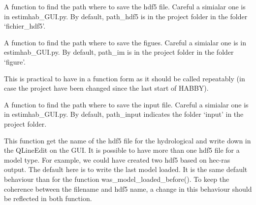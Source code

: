\documentclass[letterpaper,10pt,english]{sphinxmanual}
\begin{document}
\begin{fulllineitems}
\begin{fulllineitems}
\end{fulllineitems}


\begin{fulllineitems}
\label{\detokenize{index:src_GUI.hydro_GUI_2.SubHydroW.find_path_hdf5}}
A function to find the path where to save the hdf5 file. Careful a simialar one is in estimhab\_GUI.py. By default,
path\_hdf5 is in the project folder in the folder `fichier\_hdf5'.

\end{fulllineitems}


\begin{fulllineitems}
\label{\detokenize{index:src_GUI.hydro_GUI_2.SubHydroW.find_path_im}}
A function to find the path where to save the figues. Careful a simialar one is in estimhab\_GUI.py. By default,
path\_im is in the project folder in the folder `figure'.

This is practical to have in a function form as it should be called repeatably (in case the project have been
changed since the last start of HABBY).

\end{fulllineitems}


\begin{fulllineitems}
\label{\detokenize{index:src_GUI.hydro_GUI_2.SubHydroW.find_path_input}}
A function to find the path where to save the input file. Careful a simialar one is in estimhab\_GUI.py. By default,
path\_input indicates the folder `input' in the project folder.

\end{fulllineitems}


\begin{fulllineitems}
\label{\detokenize{index:src_GUI.hydro_GUI_2.SubHydroW.gethdf5_name_gui}}
This function get the name of the hdf5 file for the hydrological and write down in the QLineEdit on the GUI.
It is possible to have more than one hdf5 file for a model type. For example, we could have created two hdf5
based on hec-ras output. The default here is to write the last model loaded. It is the same default behaviour
than for the function was\_model\_loaded\_before(). To keep the coherence between the filename and hdf5 name,
a change in this behaviour should be reflected in both function.


\end{fulllineitems}
\end{fulllineitems}
\end{document}

